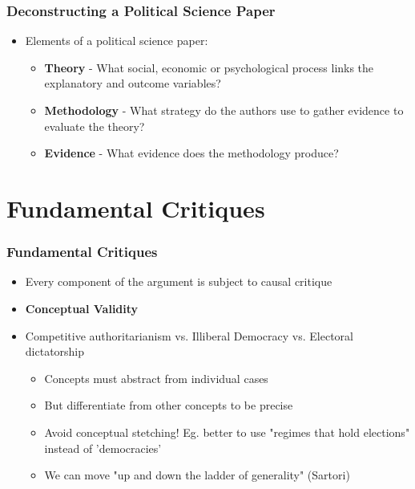 \documentclass[xcolor=x11names,compress]{beamer}\usepackage[]{graphicx}\usepackage[]{xcolor}
\renewcommand{\(}{\begin{columns}}
\renewcommand{\)}{\end{columns}}
\newcommand{\<}[1]{\begin{column}{#1}}
\renewcommand{\>}{\end{column}}
\begin{document}
\begin{frame}
\frametitle{Deconstructing a Political Science Paper}
\begin{itemize}
\item Elements of a political science paper:
\begin{itemize}
\item \textbf{Theory} - What social, economic or psychological process links the explanatory and outcome variables? 
\pause
\item \textbf{Methodology} - What strategy do the authors use to gather evidence to evaluate the theory?
\pause
\item \textbf{Evidence} - What evidence does the methodology produce?
\end{itemize}
\end{itemize}
\end{frame}





\section{Fundamental Critiques}

\begin{frame}
\frametitle{Fundamental Critiques}
\begin{itemize}
\item Every component of the argument is subject to causal critique
\pause
\item \textbf{Conceptual Validity}
\pause
\item Competitive authoritarianism vs. Illiberal Democracy vs. Electoral dictatorship
\pause
\begin{itemize}
\item Concepts must abstract from individual cases
\pause
\item But differentiate from other concepts to be precise
\pause
\item Avoid conceptual stetching! Eg. better to use "regimes that hold elections" instead of 'democracies'
\pause
\item We can move "up and down the ladder of generality" (Sartori)
\pause
\end{itemize}
\end{itemize}
\end{frame}
\end{document}
